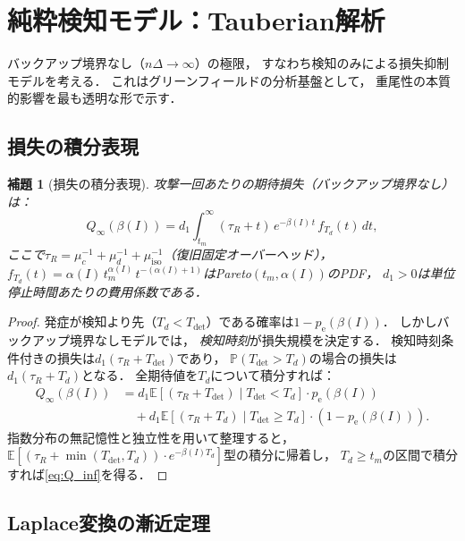 \documentclass[12pt,a4paper]{article}
\theoremstyle{plain}
\newtheorem{lemma}[theorem]{補題}
\theoremstyle{definition}
\theoremstyle{remark}
\newcommand{\E}{\mathbb{E}}
\newcommand{\Prob}{\mathbb{P}}
\newcommand{\pe}{p_{\mathrm{e}}}
\newcommand{\Qinf}{Q_{\infty}}
\newcommand{\Tdet}{T_{\mathrm{det}}}
\newcommand{\betaI}{\beta(I)}
\newcommand{\alphI}{\alpha(I)}
\begin{document}
\section{純粋検知モデル：Tauberian解析}
\label{sec:detection}

バックアップ境界なし（$n\Delta\to\infty$）の極限，
すなわち検知のみによる損失抑制モデルを考える．
これはグリーンフィールドの分析基盤として，
重尾性の本質的影響を最も透明な形で示す．

\subsection{損失の積分表現}

\begin{lemma}[損失の積分表現]\label{lem:loss_rep}
攻撃一回あたりの期待損失（バックアップ境界なし）は：
\begin{equation}\label{eq:Q_inf}
  \Qinf(\betaI)
  = d_1\int_{t_m}^{\infty}(\tau_R+t)\,e^{-\betaI\,t}\,f_{T_d}(t)\,dt,
\end{equation}
ここで$\tau_R=\mu_c^{-1}+\mu_d^{-1}+\mu_{\mathrm{iso}}^{-1}$（復旧固定オーバーヘッド），
$f_{T_d}(t)=\alphI\,t_m^{\alphI}\,t^{-(\alphI+1)}$はPareto$(t_m,\alphI)$のPDF，
$d_1>0$は単位停止時間あたりの費用係数である．
\end{lemma}

\begin{proof}
発症が検知より先（$T_d<\Tdet$）である確率は$1-\pe(\betaI)$．
しかしバックアップ境界なしモデルでは，
\emph{検知時刻}が損失規模を決定する．
検知時刻条件付きの損失は$d_1(\tau_R+\Tdet)$であり，
$\Prob(\Tdet>T_d)$の場合の損失は$d_1(\tau_R+T_d)$となる．
全期待値を$T_d$について積分すれば：
\begin{align*}
  \Qinf(\betaI)
  &= d_1\E[(\tau_R+\Tdet)\mid\Tdet<T_d]\cdot\pe(\betaI)\\
  &\quad + d_1\E[(\tau_R+T_d)\mid\Tdet\ge T_d]\cdot(1-\pe(\betaI)).
\end{align*}
指数分布の無記憶性と独立性を用いて整理すると，
$\E[(\tau_R+\min(\Tdet,T_d))\cdot e^{-\betaI T_d}]$型の積分に帰着し，
$T_d\ge t_m$の区間で積分すれば\eqref{eq:Q_inf}を得る．
\end{proof}

\subsection{Laplace変換の漸近定理}
\end{document}
